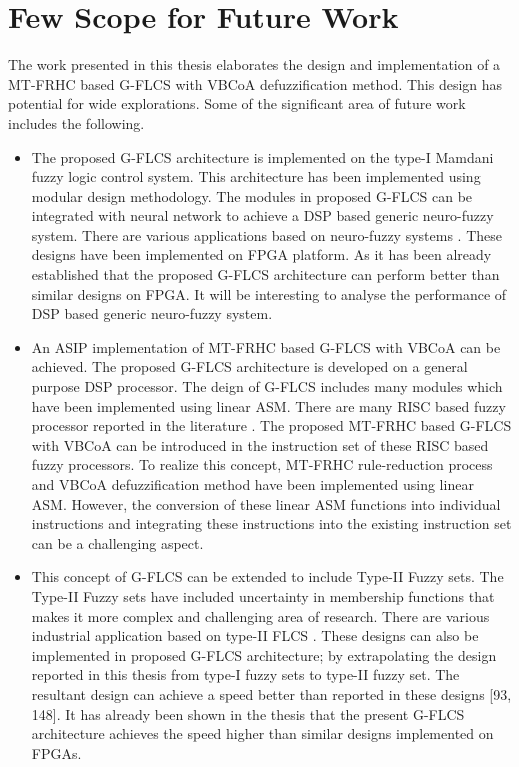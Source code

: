 \section{Few Scope for Future Work}
The work presented in this thesis elaborates the design and implementation of a MT-FRHC based G-FLCS with VBCoA defuzzification method. This design has potential for wide explorations. Some of the significant area of future work includes the following.
\begin{itemize}
	\item The proposed G-FLCS architecture is implemented on the type-I Mamdani fuzzy logic control system. This architecture has been implemented using modular design methodology. The modules in proposed G-FLCS can be integrated with neural network to achieve a DSP based generic neuro-fuzzy	system. There are various applications based on neuro-fuzzy systems	\cite{Karuppusamy2015,Uddin2014}. These designs have been implemented on FPGA platform. As it has been already established that the proposed G-FLCS architecture can perform better than similar designs on FPGA. It will be interesting to analyse the performance of DSP based generic neuro-fuzzy system.
	
	\item An ASIP implementation of MT-FRHC based G-FLCS with VBCoA can be achieved. The proposed G-FLCS architecture is developed on a general	purpose DSP processor. The deign of G-FLCS includes many modules which have been implemented using linear ASM. There are many RISC based fuzzy processor reported in the literature \cite{Bosque2014b,Selvaperumal2014}. The proposed MT-FRHC based G-FLCS with VBCoA can be introduced in the instruction	set of these RISC based fuzzy processors. To realize this concept, MT-FRHC	rule-reduction process and VBCoA defuzzification method have	been implemented using linear ASM. However, the conversion of these	linear ASM functions into individual instructions and integrating these instructions into the existing instruction set can be a challenging aspect.
	
	\item This concept of G-FLCS can be extended to include Type-II Fuzzy sets. The Type-II Fuzzy sets have included uncertainty in membership functions that makes it more complex and challenging area of research. There	are various industrial application based on type-II FLCS \cite{Linda2011,Schrieber2015}. These designs can also be implemented in proposed G-FLCS architecture; by extrapolating the design reported in this thesis from type-I fuzzy sets to type-II fuzzy set. The resultant design can achieve a speed better than reported in these designs [93, 148]. It has already been shown in the thesis that the present G-FLCS architecture achieves the speed higher than similar designs implemented on FPGAs.
\end{itemize}

